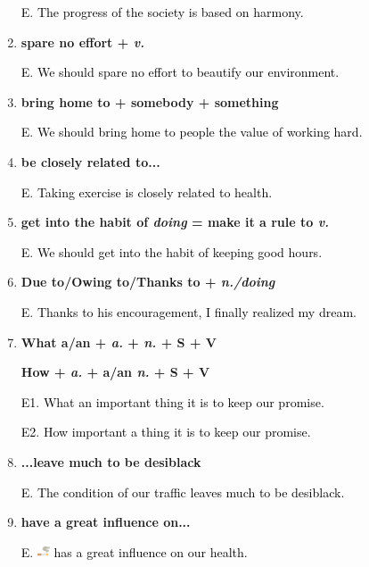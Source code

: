 \documentclass{article}
\begin{document}
\begin{enumerate}
  \textcolor{black}E. \textcolor{black}{The progress of the society is based on harmony.}

\item \textbf{spare no effort + \emph{v.}}

  \textcolor{black}E. \textcolor{black}{We should spare no effort to beautify our environment.}

\item \textbf{bring home to + somebody + something}

  \textcolor{black}E. \textcolor{black}{We should bring home to people the value of working
  hard.}

\item \textbf{be closely related to...}

  \textcolor{black}E. \textcolor{black}{Taking exercise is closely related to health.}

\item \textbf{get into the habit of \emph{doing} = make it a rule to \emph{v.}}

  \textcolor{black}E. \textcolor{black}{We should get into the habit of keeping good hours.}

\item \textbf{Due to/Owing to/Thanks to + \emph{n./doing}}

  \textcolor{black}E. \textcolor{black}{Thanks to his encouragement, I finally realized my dream.}

\item \textbf{What a/an + \emph{a.} + \emph{n.} + S + V}
  
    \textbf{How + \emph{a.} + a/an \emph{n.}  + S + V}

  \textcolor{black}{E1}. \textcolor{black}{What an important thing it is to keep our
    promise.}

  \textcolor{black}{E2}. \textcolor{black}{How important a thing it is to keep our promise.}

\item \textbf{...leave much to be desiblack}

  \textcolor{black}E. \textcolor{black}{The condition of our traffic leaves much to be desiblack.}

\item \textbf{have a great influence on...}

  \textcolor{black}E. \includegraphics[height=1em]{smoking}\textcolor{black}{ has a great
    influence on our health.}


\end{enumerate}
\end{document}
